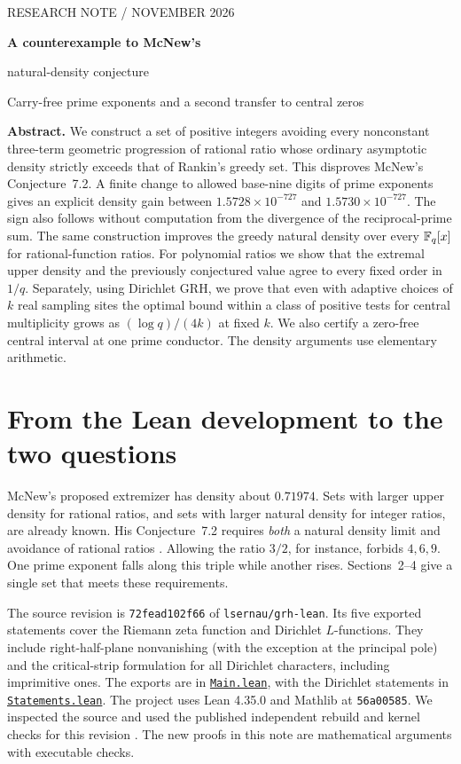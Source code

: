 \documentclass[11pt,letterpaper]{article}
\theoremstyle{definition}\newtheorem{definition}[theorem]{Definition}
\newcommand{\grhfile}[2]{\href{https://github.com/lsernau/grh-lean/blob/72fead102f663d5c7a407964a13dc0cf9d977207/grh/#1}{#2}}
\begin{document}
\thispagestyle{plain}
\begin{center}
{\small\sffamily\color{teal!55!black} RESEARCH NOTE \quad /  NOVEMBER 2026}\par
\vspace{9pt}
{\LARGE\bfseries A counterexample to McNew's\par natural-density conjecture}\par
\vspace{7pt}
{\large Carry-free prime exponents and a second transfer to central zeros}
\end{center}
\medskip
\noindent\textbf{Abstract.}
We construct a set of positive integers avoiding every nonconstant three-term geometric progression of rational ratio whose ordinary asymptotic density strictly exceeds that of Rankin's greedy set. This disproves McNew's Conjecture~7.2. A finite change to allowed base-nine digits of prime exponents gives an explicit density gain between $1.5728\times10^{-727}$ and $1.5730\times10^{-727}$. The sign also follows without computation from the divergence of the reciprocal-prime sum. The same construction improves the greedy natural density over every $\mathbb F_q[x]$ for rational-function ratios. For polynomial ratios we show that the extremal upper density and the previously conjectured value agree to every fixed order in $1/q$. Separately, using Dirichlet GRH, we prove that even with adaptive choices of $k$ real sampling sites the optimal bound within a class of positive tests for central multiplicity grows as $(\log q)/(4k)$ at fixed $k$. We also certify a zero-free central interval at one prime conductor. The density arguments use elementary arithmetic.
\section{From the Lean development to the two questions}
McNew's proposed extremizer has density about $0.71974$. Sets with larger upper density for rational ratios, and sets with larger natural density for integer ratios, are already known. His Conjecture~7.2 requires \emph{both} a natural density limit and avoidance of rational ratios \cite{mcnew}. Allowing the ratio $3/2$, for instance, forbids $4,6,9$. One prime exponent falls along this triple while another rises. Sections~2--4 give a single set that meets these requirements.

The source revision is \texttt{72fead102f66} of \texttt{lsernau/grh-lean}. Its five exported statements cover the Riemann zeta function and Dirichlet $L$-functions. They include right-half-plane nonvanishing (with the exception at the principal pole) and the critical-strip formulation for all Dirichlet characters, including imprimitive ones. The exports are in \grhfile{src/Main.lean}{\texttt{Main.lean}}, with the Dirichlet statements in \grhfile{src/Statements.lean}{\texttt{Statements.lean}}. The project uses Lean 4.35.0 and Mathlib at \texttt{56a00585}. We inspected the source and used the published independent rebuild and kernel checks for this revision \cite{sutherland}. The new proofs in this note are mathematical arguments with executable checks.
\end{document}
